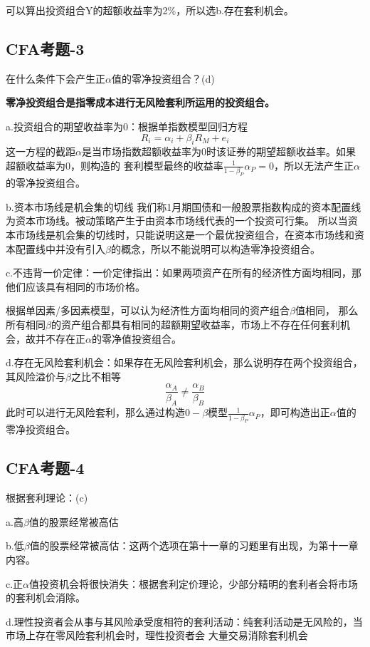 \documentclass{article}
\begin{document}
可以算出投资组合Y的超额收益率为2\%，所以选b.存在套利机会。


\subsection*{CFA考题-3}
在什么条件下会产生正$\alpha$值的零净投资组合？(d)

\textbf{零净投资组合是指零成本进行无风险套利所运用的投资组合。}

a.投资组合的期望收益率为0：根据单指数模型回归方程
\[R_i=\alpha_i + \beta_i R_M +e_i\]
这一方程的截距$\alpha$是当市场指数超额收益率为0时该证券的期望超额收益率。如果超额收益率为0，则构造的
套利模型最终的收益率$\frac{1}{1-\beta_P}\alpha_P=0$，所以无法产生正$\alpha $的零净投资组合。

b.资本市场线是机会集的切线
我们称1月期国债和一般股票指数构成的资本配置线为资本市场线。被动策略产生于由资本市场线代表的一个投资可行集。
所以当资本市场线是机会集的切线时，只能说明这是一个最优投资组合，在资本市场线和资本配置线中并没有引入$\beta$的概念，所以不能说明可以构造零净投资组合。

c.不违背一价定律：一价定律指出：如果两项资产在所有的经济性方面均相同，那他们应该具有相同的市场价格。

根据单因素/多因素模型，可以认为经济性方面均相同的资产组合$\beta $值相同，
那么所有相同$\beta$的资产组合都具有相同的超额期望收益率，市场上不存在任何套利机会，故并不存在正$\alpha$的零净值投资组合。

d.存在无风险套利机会：如果存在无风险套利机会，那么说明存在两个投资组合，其风险溢价与$\beta $之比不相等
\[\frac{\alpha_A}{\beta_A}\neq \frac{\alpha_B}{\beta_B}\]
此时可以进行无风险套利，那么通过构造$0-\beta$模型$\frac{1}{1-\beta_P}\alpha_P$，即可构造出正$\alpha$值的零净投资组合。



\subsection*{CFA考题-4}
根据套利理论：(c)

a.高$\beta$值的股票经常被高估

b.低$\beta$值的股票经常被高估：这两个选项在第十一章的习题里有出现，为第十一章内容。

c.正$\alpha $值投资机会将很快消失：根据套利定价理论，少部分精明的套利者会将市场的套利机会消除。

d.理性投资者会从事与其风险承受度相符的套利活动：纯套利活动是无风险的，当市场上存在零风险套利机会时，理性投资者会
大量交易消除套利机会
\end{document}
